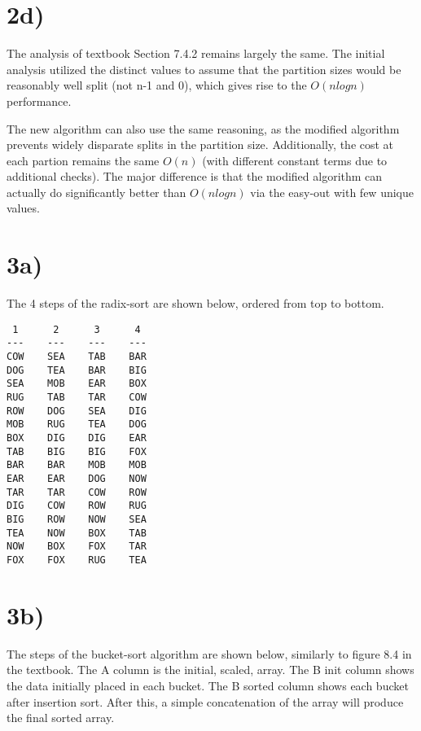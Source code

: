 \documentclass[a4paper,11pt]{article}
\begin{document}
\section*{2d)}
The analysis of textbook Section 7.4.2 remains largely the same.  
The initial analysis utilized the distinct values to 
assume that the partition sizes would be reasonably well split (not n-1 and 0),
which gives rise to the $O(nlogn)$ performance.  

The new algorithm can also use the same reasoning, as the modified 
algorithm prevents widely disparate splits in the partition size.  Additionally,
the cost at each partion remains the same $O(n)$ (with different constant terms 
due to additional checks).  The major difference is that the modified algorithm
can actually do significantly better than $O(n logn)$ via the easy-out with
few unique values.


\section*{3a)}
The 4 steps of the radix-sort are shown below, ordered from
top to bottom.

\begin{verbatim}
 1      2      3      4
---    ---    ---    ---
COW    SEA    TAB    BAR   
DOG    TEA    BAR    BIG   
SEA    MOB    EAR    BOX   
RUG    TAB    TAR    COW   
ROW    DOG    SEA    DIG   
MOB    RUG    TEA    DOG   
BOX    DIG    DIG    EAR   
TAB    BIG    BIG    FOX   
BAR    BAR    MOB    MOB   
EAR    EAR    DOG    NOW   
TAR    TAR    COW    ROW   
DIG    COW    ROW    RUG   
BIG    ROW    NOW    SEA   
TEA    NOW    BOX    TAB   
NOW    BOX    FOX    TAR   
FOX    FOX    RUG    TEA  
\end{verbatim} 

\section*{3b)}
The steps of the bucket-sort algorithm are shown below, similarly to figure
8.4 in the textbook.  The A column is the initial, scaled, array.  The B init
column shows the data initially placed in each bucket.  The B sorted column
shows each bucket after insertion sort.  After this, a simple concatenation
of the array will produce the final sorted array.
\end{document}
